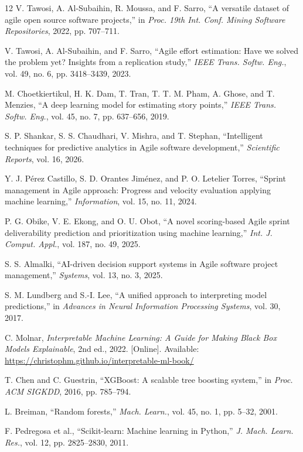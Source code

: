 \documentclass[conference]{IEEEtran}
\begin{document}
\begin{thebibliography}{12}
 V. Tawosi, A. Al-Subaihin, R. Moussa, and F. Sarro, ``A versatile dataset of agile open source software projects,'' in \emph{Proc. 19th Int. Conf. Mining Software Repositories}, 2022, pp. 707--711.

 V. Tawosi, A. Al-Subaihin, and F. Sarro, ``Agile effort estimation: Have we solved the problem yet? Insights from a replication study,'' \emph{IEEE Trans. Softw. Eng.}, vol. 49, no. 6, pp. 3418--3439, 2023.

 M. Choetkiertikul, H. K. Dam, T. Tran, T. T. M. Pham, A. Ghose, and T. Menzies, ``A deep learning model for estimating story points,'' \emph{IEEE Trans. Softw. Eng.}, vol. 45, no. 7, pp. 637--656, 2019.

 S. P. Shankar, S. S. Chaudhari, V. Mishra, and T. Stephan, ``Intelligent techniques for predictive analytics in Agile software development,'' \emph{Scientific Reports}, vol. 16, 2026.

 Y. J. P\'{e}rez Castillo, S. D. Orantes Jim\'{e}nez, and P. O. Letelier Torres, ``Sprint management in Agile approach: Progress and velocity evaluation applying machine learning,'' \emph{Information}, vol. 15, no. 11, 2024.

 P. G. Obike, V. E. Ekong, and O. U. Obot, ``A novel scoring-based Agile sprint deliverability prediction and prioritization using machine learning,'' \emph{Int. J. Comput. Appl.}, vol. 187, no. 49, 2025.

 S. S. Almalki, ``AI-driven decision support systems in Agile software project management,'' \emph{Systems}, vol. 13, no. 3, 2025.

 S. M. Lundberg and S.-I. Lee, ``A unified approach to interpreting model predictions,'' in \emph{Advances in Neural Information Processing Systems}, vol. 30, 2017.

 C. Molnar, \emph{Interpretable Machine Learning: A Guide for Making Black Box Models Explainable}, 2nd ed., 2022. [Online]. Available: \url{https://christophm.github.io/interpretable-ml-book/}

 T. Chen and C. Guestrin, ``XGBoost: A scalable tree boosting system,'' in \emph{Proc. ACM SIGKDD}, 2016, pp. 785--794.

 L. Breiman, ``Random forests,'' \emph{Mach. Learn.}, vol. 45, no. 1, pp. 5--32, 2001.

 F. Pedregosa et al., ``Scikit-learn: Machine learning in Python,'' \emph{J. Mach. Learn. Res.}, vol. 12, pp. 2825--2830, 2011.
\end{thebibliography}
\end{document}
